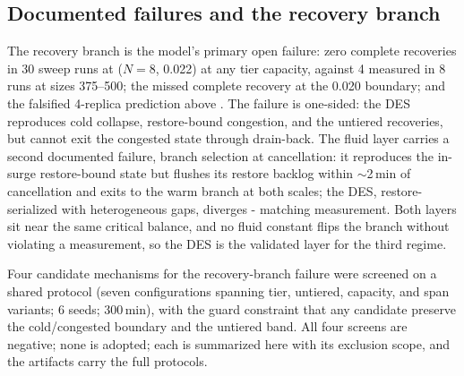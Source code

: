 \subsection{Documented failures and the recovery branch}
\label{sec:failures}

The recovery branch is the model's primary open failure: zero
complete recoveries in 30 sweep runs at ($N{=}8$, 0.022) at any tier
capacity, against 4 measured in 8 runs at sizes 375--500; the missed
complete recovery at the 0.020 boundary; and the falsified 4-replica
prediction above . The failure is one-sided: the DES reproduces
cold collapse, restore-bound congestion, and the untiered
recoveries, but cannot exit the congested state through drain-back.
The fluid layer carries a second documented failure, branch
selection at cancellation: it reproduces the in-surge restore-bound
state but flushes its restore backlog within $\sim$2\,min of cancellation
and exits to the warm branch at both scales; the DES,
restore-serialized with heterogeneous gaps, diverges - matching
measurement. Both layers sit near the same critical balance, and no
fluid constant flips the branch without violating a measurement, so
the DES is the validated layer for the third regime.

Four candidate mechanisms for the recovery-branch failure were
screened on a shared protocol (seven configurations spanning tier,
untiered, capacity, and span variants; 6 seeds; 300\,min), with the
guard constraint that any candidate preserve the cold/congested
boundary and the untiered band. All four screens are negative; none
is adopted; each is summarized here with its exclusion scope, and
the artifacts carry the full protocols.

